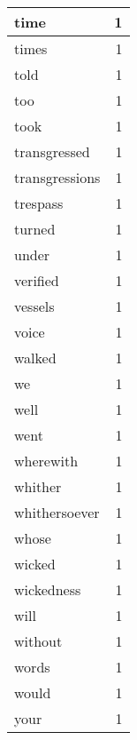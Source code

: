 \begin{center}
\begin{longtable}{l|r}
time & 1 \\ \hline
times & 1 \\ \hline
told & 1 \\ \hline
too & 1 \\ \hline
took & 1 \\ \hline
transgressed & 1 \\ \hline
transgressions & 1 \\ \hline
trespass & 1 \\ \hline
turned & 1 \\ \hline
under & 1 \\ \hline
verified & 1 \\ \hline
vessels & 1 \\ \hline
voice & 1 \\ \hline
walked & 1 \\ \hline
we & 1 \\ \hline
well & 1 \\ \hline
went & 1 \\ \hline
wherewith & 1 \\ \hline
whither & 1 \\ \hline
whithersoever & 1 \\ \hline
whose & 1 \\ \hline
wicked & 1 \\ \hline
wickedness & 1 \\ \hline
will & 1 \\ \hline
without & 1 \\ \hline
words & 1 \\ \hline
would & 1 \\ \hline
your & 1 \\ \hline
\end{longtable}
\end{center}



\normalsize



 
